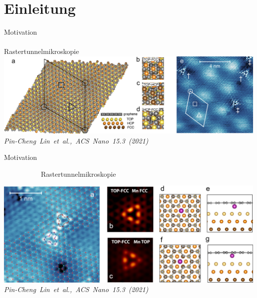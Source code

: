 \documentclass[aspectratio=1610, 9pt, xcolor=dvipsnames]{beamer}
\begin{document}
\section{Einleitung}
\begin{frame}{Motivation}
     $\quad \quad \quad \quad \quad \quad \quad \quad \quad \quad \quad \quad \quad \quad \quad \quad \quad \quad \quad \quad \quad \quad \quad \quad \quad \quad
     \quad \quad \quad \quad \quad \quad \quad \quad \quad \quad \quad \quad$
     Rastertunnelmikroskopie
  \centering
  \includegraphics[width = \textwidth]{Plots/images_large_nn1c00139_0002.jpeg}
  \hspace*{12pt}\hbox{\scriptsize {\footnotesize\itshape Pin-Cheng Lin et al., \textit{ACS Nano 15.3 (2021)} }}
\end{frame}
  \begin{frame}{Motivation}
    \begin{flushleft}
      $\quad \quad \quad \quad \quad$ Rastertunnelmikroskopie
    \end{flushleft}
    \vspace*{-0.27cm}
    \centering
  \includegraphics[width = \textwidth]{Plots/images_large_nn1c00139_0003.jpeg}
  \hspace*{12pt}\hbox{\scriptsize {\footnotesize\itshape Pin-Cheng Lin et al., \textit{ACS Nano 15.3 (2021)} }}
\end{frame}
\end{document}
